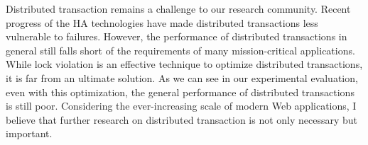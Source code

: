 \documentclass[conference]{IEEEtran}
\begin{document}
Distributed transaction remains a challenge to our research community. Recent progress of the HA technologies have made distributed transactions less vulnerable to failures.
However, the performance of distributed transactions in general still falls short of the requirements of many mission-critical applications.
While lock violation is an effective technique to optimize distributed transactions, it is far from an ultimate solution.
As we can see in our experimental evaluation, even with this optimization, the general performance of distributed transactions is still poor.
Considering the ever-increasing scale of modern Web applications, I believe that further research on distributed transaction is not only necessary but important.



\end{document}
